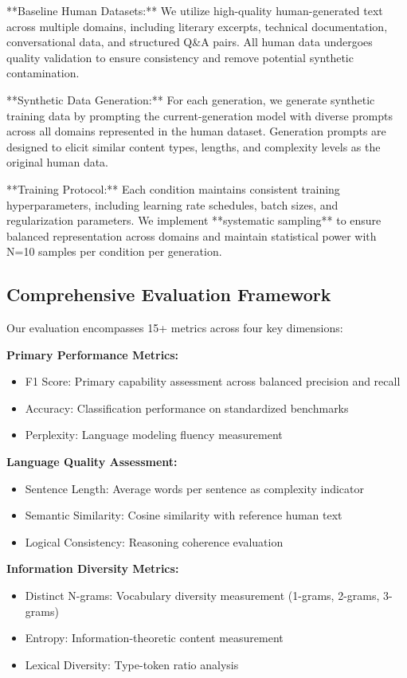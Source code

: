 \documentclass{article}
\begin{document}
**Baseline Human Datasets:** We utilize high-quality human-generated text across multiple domains, including literary excerpts, technical documentation, conversational data, and structured Q\&A pairs. All human data undergoes quality validation to ensure consistency and remove potential synthetic contamination.

**Synthetic Data Generation:** For each generation, we generate synthetic training data by prompting the current-generation model with diverse prompts across all domains represented in the human dataset. Generation prompts are designed to elicit similar content types, lengths, and complexity levels as the original human data.

**Training Protocol:** Each condition maintains consistent training hyperparameters, including learning rate schedules, batch sizes, and regularization parameters. We implement **systematic sampling** to ensure balanced representation across domains and maintain statistical power with N=10 samples per condition per generation.

\subsection{Comprehensive Evaluation Framework}

Our evaluation encompasses 15+ metrics across four key dimensions:

\textbf{Primary Performance Metrics:}
\begin{itemize}
\item F1 Score: Primary capability assessment across balanced precision and recall
\item Accuracy: Classification performance on standardized benchmarks
\item Perplexity: Language modeling fluency measurement
\end{itemize}

\textbf{Language Quality Assessment:}
\begin{itemize}
\item Sentence Length: Average words per sentence as complexity indicator
\item Semantic Similarity: Cosine similarity with reference human text
\item Logical Consistency: Reasoning coherence evaluation
\end{itemize}

\textbf{Information Diversity Metrics:}
\begin{itemize}
\item Distinct N-grams: Vocabulary diversity measurement (1-grams, 2-grams, 3-grams)
\item Entropy: Information-theoretic content measurement
\item Lexical Diversity: Type-token ratio analysis
\end{itemize}
\end{document}
